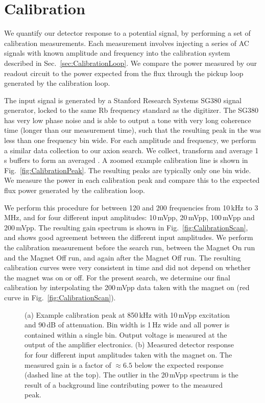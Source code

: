\documentclass[aps,prd,amsmath,amssymb,reprint,superscriptaddress, nofootinbib,
]{revtex4-1}
\begin{document}
 
\section{Calibration}
\label{sec:Calibration}

We quantify our detector response to a potential \ADM signal, by performing a set of calibration measurements. Each measurement involves injecting a series of AC signals with known amplitude and frequency into the calibration system described in Sec.~\ref{sec:CalibrationLoop}. We compare the power measured by our readout circuit to the power expected from the flux through the pickup loop generated by the calibration loop.

The input signal is generated by a Stanford Research Systems SG380 signal generator, locked to the same Rb frequency standard as the digitizer. The SG380 has very low phase noise and is able to output a tone with very long coherence time (longer than our measurement time), such that the resulting peak in the \PSD was less than one frequency bin wide. For each amplitude and frequency, we perform a similar data collection to our axion search. We collect, transform and average 1\,s buffers to form an averaged \PSD. A zoomed example calibration line is shown in Fig.~\ref{fig:CalibrationPeak}. The resulting peaks are typically only one bin wide. We measure the power in each calibration peak and compare this to the expected flux power generated by the calibration loop. 

We perform this procedure for between 120 and 200 frequencies from 10\,kHz to 3\,MHz, and for four different input amplitudes: 10\,mVpp, 20\,mVpp, 100\,mVpp and 200\,mVpp. The resulting gain spectrum is shown in Fig.~\ref{fig:CalibrationScan}, and shows good agreement between the different input amplitudes.  We perform the calibration measurement before the \ADM search run, between the Magnet On run and the Magnet Off run, and again after the Magnet Off run. The resulting calibration curves were very consistent in time and did not depend on whether the magnet was on or off. For the present search, we determine our final calibration by interpolating the 200\,mVpp data taken with the magnet on (red curve in Fig.~\ref{fig:CalibrationScan}).

\begin{figure*}
\centering
{}\hspace{.5cm}
\caption{(a) Example calibration peak at 850\,kHz with 10\,mVpp excitation and 90\,dB of attenuation. Bin width is 1\,Hz wide and all power is contained within a single bin. Output voltage is measured at the output of the amplifier electronics. (b) Measured detector response for four different input amplitudes taken with the magnet on. The measured gain is a factor of $\approx6.5$ below the expected response (dashed line at the top). The outlier in the 20\,mVpp spectrum is the result of a background line contributing power to the measured peak.}
\label{fig:CalibrationPlots}
\end{figure*}
\end{document}
